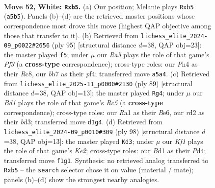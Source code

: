 \documentclass[11pt]{article}
\begin{document}
\clearpage

\begin{figure}[p]\centering
\begin{subfigure}{0.46\textwidth}\centering
\resizebox{\linewidth}{!}{%
\newchessgame
\chessboard[
  setfen={4r3/1b3p1k/6p1/Rp6/7P/1P6/2Pr4/R2B1K2 w - - 0 52},
  showmover=false,
  pgfstyle=straightmove, color=movearrow, markmove={a5-b5}
]}
\caption{}
\end{subfigure}\hfill
\begin{subfigure}{0.46\textwidth}\centering
\resizebox{\linewidth}{!}{%
\newchessgame
\chessboard[
  setfen={2r5/1p2r3/3Rbpk1/P1p5/2P1PP2/2B1K3/8/7R b - - 2 48},
  showmover=false,
  pgfstyle=straightmove, color=movearrow, markmove={f6-f5}
]}
\caption{}
\end{subfigure}
\\[4pt]
\begin{subfigure}{0.46\textwidth}\centering
\resizebox{\linewidth}{!}{%
\newchessgame
\chessboard[
  setfen={8/R7/2p1b1P1/pp2k3/2r5/P2BK3/1P6/8 b - - 8 45},
  showmover=false,
  pgfstyle=straightmove, color=movearrow, markmove={c4-g4}
]}
\caption{}
\end{subfigure}\hfill
\begin{subfigure}{0.46\textwidth}\centering
\resizebox{\linewidth}{!}{%
\newchessgame
\chessboard[
  setfen={7k/R2R2p1/7p/7P/2rP2P1/8/4K3/8 w - - 7 50},
  showmover=false,
  pgfstyle=straightmove, color=movearrow, markmove={e2-d3}
]}
\caption{}
\end{subfigure}
\caption{\textbf{Move 52, White: \texttt{Rxb5}.} (a) Our position; Melanie plays \texttt{Rxb5} (\texttt{a5b5}). Panels (b)--(d) are the retrieved master positions whose correspondence most drove this move (highest QAP objective among those that transfer to it). (b) Retrieved from \texttt{lichess\_elite\_2024-09\_p0022\#2656} (ply 95) [structural distance $d$=38, QAP obj=23]: the master played \texttt{f5}; under $\mu$ our \emph{Ra5} plays the role of that game's \emph{Pf3} (a \textbf{cross-type} correspondence); cross-type roles: our \emph{P}h4 as their \emph{R}c8, our \emph{b}b7 as their \emph{p}f4; transferred move \texttt{a5a4}. (c) Retrieved from \texttt{lichess\_elite\_2025-11\_p0000\#2130} (ply 89) [structural distance $d$=38, QAP obj=13]: the master played \texttt{Rg4}; under $\mu$ our \emph{Bd1} plays the role of that game's \emph{Rc5} (a \textbf{cross-type} correspondence); cross-type roles: our \emph{R}a1 as their \emph{B}e6, our \emph{r}d2 as their \emph{b}d3; transferred move \texttt{d1g4}. (d) Retrieved from \texttt{lichess\_elite\_2024-09\_p0010\#309} (ply 98) [structural distance $d$=38, QAP obj=13]: the master played \texttt{Kd3}; under $\mu$ our \emph{Kf1} plays the role of that game's \emph{Ke2}; cross-type roles: our \emph{B}d1 as their \emph{P}d4; transferred move \texttt{f1g1}. Synthesis: no retrieved analog transferred to \texttt{Rxb5} -- the \texttt{search} selector chose it on value (material / mate); panels (b)--(d) show the strongest nearby analogies.}
\label{fig:thought-m102}
\end{figure}
\end{document}

